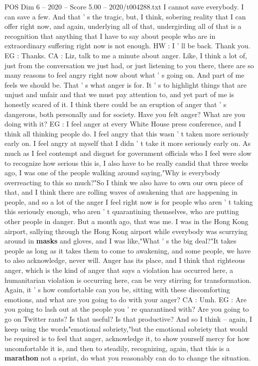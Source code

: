 \begin{textsample}{POS Dim 6 – 2020 – Score 5.00 – 2020/t004288.txt}
I cannot save everybody.
I can save a few.
And that ' s the tragic, but, I think, sobering reality that I can offer right now, and again, underlying all of that, undergirding all of that is a recognition that anything that I have to say about people who are in extraordinary suffering right now is not enough.
HW : I ' ll be back.
Thank you.
EG : Thanks.
CA : Liz, talk to me a minute about anger.
Like, I think a lot of, just from the conversation we just had, or just listening to you there, there are so many reasons to feel angry right now about what ' s going on.
And part of me feels we should be.
That ' s what anger is for.
It ' s to highlight things that are unjust and unfair and that we must pay attention to, and yet part of me is honestly scared of it.
I think there could be an eruption of anger that ' s dangerous, both personally and for society.
Have you felt anger?
What are you doing with it?
EG : I feel anger at every White House press conference, and I think all thinking people do.
I feel angry that this wasn ' t taken more seriously early on.
I feel angry at myself that I didn ' t take it more seriously early on.
As much as I feel contempt and disgust for government officials who I feel were slow to recognize how serious this is, I also have to be really candid that three weeks ago, I was one of the people walking around saying,"Why is everybody overreacting to this so much?"So I think we also have to own our own piece of that, and I think there are rolling waves of awakening that are happening in people, and so a lot of the anger I feel right now is for people who aren ' t taking this seriously enough, who aren ' t quarantining themselves, who are putting other people in danger.
But a month ago, that was me.
I was in the Hong Kong airport, sallying through the Hong Kong airport while everybody was scurrying around in \textbf{masks} and gloves, and I was like,"What ' s the big deal?"It takes people as long as it takes them to come to awakening, and some people, we have to also acknowledge, never will.
Anger has its place, and I think that righteous anger, which is the kind of anger that says a violation has occurred here, a humanitarian violation is occurring here, can be very stirring for transformation.
Again, it ' s how comfortable can you be, sitting with these discomforting emotions, and what are you going to do with your anger?
CA : Umh.
EG : Are you going to lash out at the people you ' re quarantined with?
Are you going to go on Twitter rants?
Is that useful?
Is that productive?
And so I think -- again, I keep using the words"emotional sobriety,"but the emotional sobriety that would be required is to feel that anger, acknowledge it, to show yourself mercy for how uncomfortable it is, and then to steadily, recognizing, again, that this is a \textbf{marathon} not a sprint, do what you reasonably can do to change the situation.

\end{textsample}
